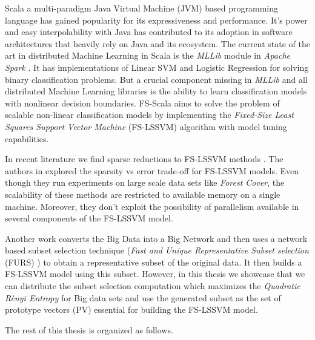 Scala \cite{scala-overview-tech-report} a multi-paradigm Java Virtual Machine (JVM) based programming language has gained popularity for its expressiveness and performance. It's power and easy interpolability with Java has contributed to its adoption in software architectures that heavily rely on Java and its ecosystem. The current state of the art in distributed Machine Learning in Scala is the \textit{MLLib} module in \textit{Apache Spark} \cite{Meng}. It has implementations of Linear SVM and Logistic Regression for solving binary classification problems. But a crucial component missing in \textit{MLLib} and all distributed Machine Learning libraries is the ability to learn classification models with nonlinear decision boundaries. FS-Scala aims to solve the problem of scalable non-linear classification models by implementing the \textit{Fixed-Size Least Squares Support Vector Machine} (FS-LSSVM) algorithm \cite{DeBrabanter2010,Suykens2002} with model tuning capabilities.

In recent literature we find sparse reductions to FS-LSSVM methods \cite{Mall2015,Mall2013}. The authors in \cite{Mall2015,Mall2013} explored the sparsity vs error trade-off for FS-LSSVM models. Even though they run experiments on large scale data sets like \emph{Forest Cover}, the scalability of these methods are restricted to available memory on a single machine. Moreover, they don't exploit the possibility of parallelism available in several components of the FS-LSSVM model. 

Another work \cite{Mall2014} converts the Big Data into a Big Network and then uses a network based subset selection technique (\textit{Fast and Unique Representative Subset selection} (FURS) \cite{Mall2013FURS}) to obtain a representative subset of the original data. It then builds a FS-LSSVM model using this subset. However, in this thesis we showcase that we can distribute the subset selection computation which maximizes the \textit{Quadratic R\`enyi Entropy} for Big data sets and use the generated subset as the set of prototype vectors (PV) essential for building the FS-LSSVM model.

The rest of this thesis is organized as follows.

